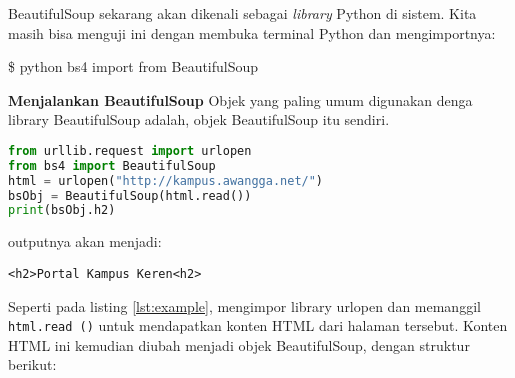 BeautifulSoup sekarang akan dikenali sebagai \textit{library} Python di sistem. Kita masih bisa menguji ini dengan membuka terminal Python dan mengimportnya:

\begin{algorithm}

\$ python
bs4 import from BeautifulSoup
\end{algorithm}

\textbf{Menjalankan BeautifulSoup}
Objek yang paling umum digunakan denga library BeautifulSoup adalah, objek BeautifulSoup itu sendiri.
\begin{lstlisting}[language=Python, label={lst:example}, caption=Contoh Sederhana]
from urllib.request import urlopen
from bs4 import BeautifulSoup
html = urlopen("http://kampus.awangga.net/")
bsObj = BeautifulSoup(html.read())
print(bsObj.h2)
\end{lstlisting}

outputnya akan menjadi:

\verb|<h2>Portal Kampus Keren<h2>|

Seperti pada listing \ref{lst:example}, mengimpor library urlopen dan memanggil \verb|html.read ()| untuk mendapatkan konten HTML dari halaman tersebut. Konten HTML ini kemudian diubah menjadi objek BeautifulSoup, dengan struktur berikut: